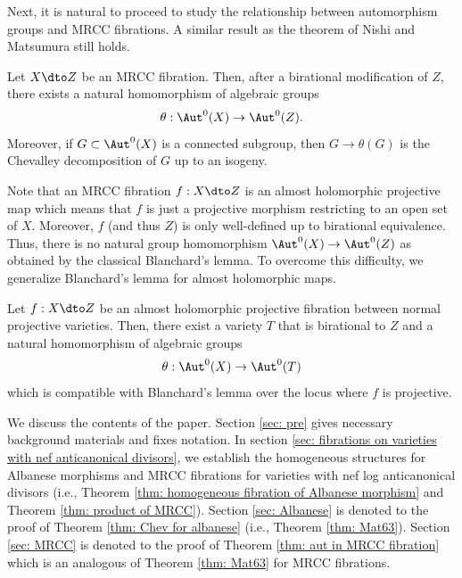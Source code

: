 \documentclass[11pt]{amsart}
\begin{document}
Next, it is natural to proceed to study the relationship between automorphism groups and MRCC fibrations. A similar result as the theorem of Nishi and Matsumura still holds.

\begin{theorem}\label{thm: aut in MRCC fibration}
Let $X \dto Z$ be an MRCC fibration. Then, after a birational modification of $Z$, there exists a natural homomorphism of algebraic groups
\[
\theta: \Aut^0(X) \to \Aut^0(Z).
\] 
Moreover, if $G \subset \Aut^0(X)$ is a connected subgroup, then $G \to \theta(G)$ is the Chevalley decomposition of $G$ up to an isogeny. 
\end{theorem}

Note that an MRCC fibration $f: X \dto Z$ is an almost holomorphic projective map which means that $f$ is just a projective morphism restricting to an open set of $X$. Moreover, $f$ (and thus $Z$) is only well-defined up to birational equivalence. Thus, there is no natural group homomorphism $\Aut^0(X) \to \Aut^0(Z)$ as obtained by the classical Blanchard's lemma. To overcome this difficulty, we generalize Blanchard's lemma for almost holomorphic maps. 


\begin{lemma}\label{lem: Blanchard for almost hol maps}
    Let $f: X \dto Z$ be an almost holomorphic projective fibration between normal projective varieties. Then, there exist a variety $T$ that is birational to $Z$ and a natural homomorphism of algebraic groups
    \[
    \theta: \Aut^0(X) \to \Aut^0(T)
    \] which is compatible with Blanchard's lemma over the locus where $f$ is projective.
\end{lemma}



We discuss the contents of the paper. Section \ref{sec: pre} gives necessary background materials and fixes notation. In section \ref{sec: fibrations on varieties with nef anticanonical divisors}, we establish the homogeneous structures for Albanese morphisms and MRCC fibrations for varieties with nef log anticanonical divisors (i.e., Theorem \ref{thm: homogeneous fibration of Albanese morphism} and Theorem \ref{thm: product of MRCC}). Section \ref{sec: Albanese} is denoted to the proof of Theorem \ref{thm: Chev for albanese} (i.e., Theorem \ref{thm: Mat63}). Section \ref{sec: MRCC} is denoted to the proof of Theorem \ref{thm: aut in MRCC fibration} which is an analogous of Theorem \ref{thm: Mat63} for MRCC fibrations. 
\end{document}
